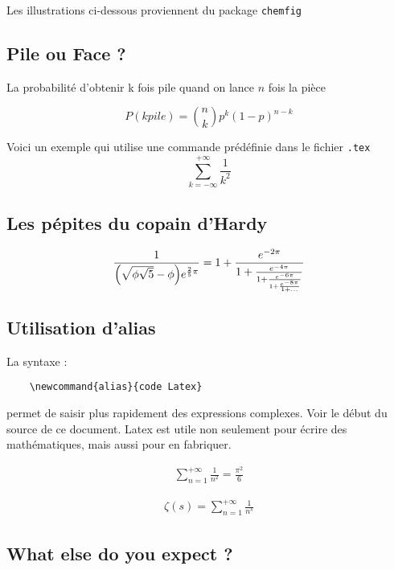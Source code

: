 \documentclass[twocolumn,a4paper]{IEEEtranfr}
\newcommand{\bear}{\begin{eqnarray}}
\newcommand{\ear}{\end{eqnarray}}
\newcommand{\sm}[1]{\sum_{#1=-\infty}^{+\infty}}
\newcommand{\smu}[1]{\sum_{#1=1}^{+\infty}}
\begin{document}
Les illustrations ci-dessous proviennent du package {\tt  chemfig}

\subsection{Pile ou Face ? }

La probabilité d'obtenir k fois pile quand on lance $n$ fois la pièce

\begin{equation}
    P(k pile)   = {n \choose k} p^k (1-p)^{ n-k}
\end{equation}

Voici un exemple qui utilise une commande prédéfinie dans le fichier {\tt .tex}
\begin{equation}
\sm{k} \frac{1}{k^2}
\end{equation}
\subsection{Les pépites du copain d'Hardy}

\begin{equation}
  \frac{1}{\Bigl(\sqrt{\phi \sqrt{5}}-\phi\Bigr) e^{\frac25 \pi}} =
    1 + \frac{e^{-2\pi}} 
             {1+\frac{e^{-4\pi}} 
             {1+\frac{e^{-6\pi}}
             {1+\frac{e^{-8\pi}} 
             {1+\ldots} } } }
\end{equation}
\subsection{Utilisation d'alias}

La syntaxe : 
\begin{verbatim} 
    \newcommand{alias}{code Latex}
\end{verbatim}
permet de saisir plus rapidement des expressions complexes. 
Voir le début du source de ce document. Latex est utile non seulement pour
écrire des mathématiques, mais aussi pour en fabriquer.

\bear
\smu{n} \frac{1}{n^2} =  \frac{\pi^2}{6}
\ear

\bear
\zeta(s)= \smu{n} \frac{1}{n^s}
\ear

\subsection{What else do you expect ? }
\end{document}

